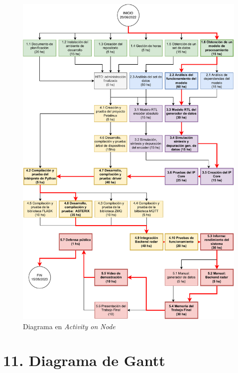 \documentclass[
11pt, %
]{charter}
\begin{document}
\begin{figure}[H]
\centering 
\includegraphics[width=.9\textwidth]{./Figuras/AoN.pdf}
\caption{Diagrama en \textit{Activity on Node}}
\label{fig:AoN}
\end{figure}

\section{11. Diagrama de Gantt}
\label{sec:gantt}
\end{document}
